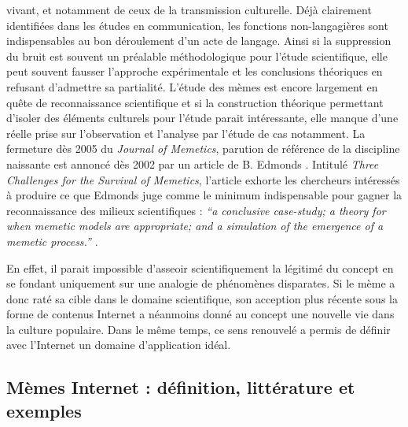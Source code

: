 vivant, et notamment de ceux de la transmission culturelle. Déjà clairement identifiées dans les études en communication, les fonctions non-langagières sont indispensables au bon déroulement d{\textquoteright}un acte de langage. Ainsi si la suppression du bruit est souvent un préalable méthodologique pour l{\textquoteright}étude scientifique, elle peut souvent fausser l{\textquoteright}approche expérimentale et les conclusions théoriques en refusant d{\textquoteright}admettre sa partialité. L{\textquoteright}étude des mèmes est encore largement en quête de reconnaissance scientifique et si la construction théorique permettant d{\textquoteright}isoler des éléments culturels pour l{\textquoteright}étude parait intéressante, elle manque d{\textquoteright}une réelle prise sur l{\textquoteright}observation et l{\textquoteright}analyse par l{\textquoteright}étude de cas notamment. La fermeture dès 2005 du \textit{Journal of Memetics}, parution de référence de la discipline naissante est annoncé dès 2002 par un article de B. Edmonds \citep{Jouxtel2014}. Intitulé \textit{Three Challenges for the Survival of Memetics}, l{\textquoteright}article\textit{ }exhorte les chercheurs intéressés à produire ce que Edmonds juge comme le minimum indispensable pour gagner la reconnaissance des milieux scientifiques : \textit{``a conclusive case-study; a theory for when memetic models are appropriate; and a simulation of the emergence of a memetic process.''} \citep{Edmonds2002}.  

En effet, il parait impossible d{\textquoteright}asseoir scientifiquement la légitimé du concept en se fondant uniquement sur une analogie de phénomènes disparates. Si le mème a donc raté sa cible dans le domaine scientifique, son acception plus récente sous la forme de contenus Internet a néanmoins donné au concept une nouvelle vie dans la culture populaire. Dans le même temps, ce sens renouvelé a permis de définir avec l'Internet un domaine d{\textquoteright}application idéal. 

\subsection[Mèmes Internet : définition, littérature et exemples]{Mèmes Internet : définition, littérature et exemples}

